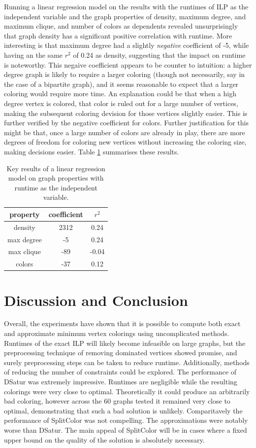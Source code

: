 \documentclass[twocolumn]{article}
\begin{document}
Running a linear regression model on the results with the runtimes of ILP as the independent variable and the graph properties of density, maximum degree, and maximum clique, and number of colors as dependents revealed unsurprisingly that graph density has a significant positive correlation with runtime. More interesting is that maximum degree had a slightly \emph{negative} coefficient of -5, while having an the same $r^2$ of 0.24 as density, suggesting that the impact on runtime is noteworthy. This negaive coefficient appears to be counter to intuition: a higher degree graph is likely to require a larger coloring (though not necessarily, say in the case of a bipartite graph), and it seems reasonable to expect that a larger coloring would require more time. An explanation could be that when a high degree vertex is colored, that color is ruled out for a large number of vertices, making the subsequent coloring devision for those vertices slightly easier. This is further verified by the negative coefficient for colors. Further justification for this might be that, once a large number of colors are already in play, there are more degrees of freedom for coloring new vertices without increasing the coloring size, making decisions easier. Table \ref{tab:stats} summarises these results.

\begin{table}[H]
	\centering
	\caption{Key results of a linear regression model on graph properties with runtime as the independent variable.}
	\begin{tabular}{|c|c|c|}
		\hline
		property   & coefficient & $r^2$ \\
		\hline
		density    & 2312 & 0.24  \\
		max degree & -5   & 0.24  \\
		max clique & -89  & -0.04 \\
		colors     & -37  & 0.12  \\
		\hline
	\end{tabular}
	\label{tab:stats}
\end{table}


\section{Discussion and Conclusion}
Overall, the experiments have shown that it is possible to compute both exact and approximate minimum vertex colorings using uncomplicated methods. Runtimes of the exact ILP will likely become infeasible on large graphs, but the preprocessing technique of removing dominated vertices showed promise, and surely preprocessing steps can be taken to reduce runtime. Additionally, methods of reducing the number of constraints could be explored. The performance of DSatur was extremely impressive. Runtimes are negligible while the resulting colorings were very close to optimal. Theoretically it could produce an arbitrarily bad coloring, however across the 60 graphs tested it remained very close to optimal, demonstrating that such a bad solution is unlikely. Comparitavely the performance of SplitColor was not compelling. The approximations were notably worse than DSatur. The main appeal of SplitColor will be in cases where a fixed upper bound on the quality of the solution is absolutely necessary.


\end{document}
